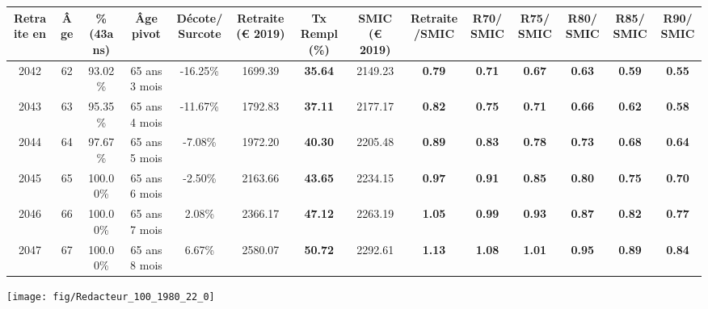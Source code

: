 \begin{adjustbox}{max width=\textwidth} 
\begin{tabular}[htb]{|c|c||c|c|c||c|c||c|c||c|c|c|c|c|} 
\hline 
 Retraite en &  Âge &  \%(43ans) &  Âge pivot &  Décote/Surcote &  Retraite (\euro{} 2019) &  Tx Rempl(\%) &  SMIC (\euro{} 2019) &  Retraite/SMIC &  R70/SMIC &  R75/SMIC &  R80/SMIC &  R85/SMIC &  R90/SMIC \\ 
\hline \hline 
 2042 &  62 &  93.02\% &  65 ans 3 mois &  -16.25\% &  1699.39 &  {\bf 35.64} &  2149.23 &  {\bf {\color{red} 0.79}} &  {\bf {\color{red} 0.71}} &  {\bf {\color{red} 0.67}} &  {\bf {\color{red} 0.63}} &  {\bf {\color{red} 0.59}} &  {\bf {\color{red} 0.55}} \\ 
\hline 
 2043 &  63 &  95.35\% &  65 ans 4 mois &  -11.67\% &  1792.83 &  {\bf 37.11} &  2177.17 &  {\bf {\color{red} 0.82}} &  {\bf {\color{red} 0.75}} &  {\bf {\color{red} 0.71}} &  {\bf {\color{red} 0.66}} &  {\bf {\color{red} 0.62}} &  {\bf {\color{red} 0.58}} \\ 
\hline 
 2044 &  64 &  97.67\% &  65 ans 5 mois &  -7.08\% &  1972.20 &  {\bf 40.30} &  2205.48 &  {\bf {\color{red} 0.89}} &  {\bf {\color{red} 0.83}} &  {\bf {\color{red} 0.78}} &  {\bf {\color{red} 0.73}} &  {\bf {\color{red} 0.68}} &  {\bf {\color{red} 0.64}} \\ 
\hline 
 2045 &  65 &  100.00\% &  65 ans 6 mois &  -2.50\% &  2163.66 &  {\bf 43.65} &  2234.15 &  {\bf {\color{red} 0.97}} &  {\bf {\color{red} 0.91}} &  {\bf {\color{red} 0.85}} &  {\bf {\color{red} 0.80}} &  {\bf {\color{red} 0.75}} &  {\bf {\color{red} 0.70}} \\ 
\hline 
 2046 &  66 &  100.00\% &  65 ans 7 mois &  2.08\% &  2366.17 &  {\bf 47.12} &  2263.19 &  {\bf 1.05} &  {\bf {\color{red} 0.99}} &  {\bf {\color{red} 0.93}} &  {\bf {\color{red} 0.87}} &  {\bf {\color{red} 0.82}} &  {\bf {\color{red} 0.77}} \\ 
\hline 
 2047 &  67 &  100.00\% &  65 ans 8 mois &  6.67\% &  2580.07 &  {\bf 50.72} &  2292.61 &  {\bf 1.13} &  {\bf 1.08} &  {\bf 1.01} &  {\bf {\color{red} 0.95}} &  {\bf {\color{red} 0.89}} &  {\bf {\color{red} 0.84}} \\ 
\hline 
\hline 
\end{tabular} 
\end{adjustbox} 
 
 \vspace{0.1cm} 

 {\hspace{-2.2cm}\texttt{[image: fig/Redacteur\_100\_1980\_22\_0]}} 

